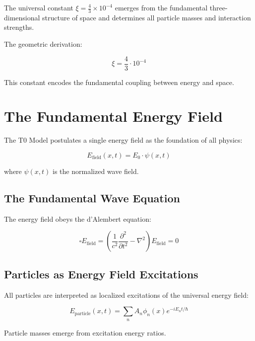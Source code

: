 	\begin{insight}
		The universal constant $\xi = \frac{4}{3} \times 10^{-4}$ emerges from the fundamental three-dimensional structure of space and determines all particle masses and interaction strengths.
	\end{insight}
	
	The geometric derivation:
	
	\begin{equation}
		\xi = \frac{4}{3} \cdot 10^{-4}
	\end{equation}
	
	This constant encodes the fundamental coupling between energy and space.
	
	
	\section{The Fundamental Energy Field}
	
	The T0 Model postulates a single energy field as the foundation of all physics:
	
	\begin{equation}
		E_{\text{field}}(x,t) = E_0 \cdot \psi(x,t)
	\end{equation}
	
	where $\psi(x,t)$ is the normalized wave field.
	
	\subsection{The Fundamental Wave Equation}
	
	The energy field obeys the d'Alembert equation:
	
	\begin{equation}
		\square E_{\text{field}} = \left(\frac{1}{c^2}\frac{\partial^2}{\partial t^2} - \nabla^2\right) E_{\text{field}} = 0
	\end{equation}
	
	\subsection{Particles as Energy Field Excitations}
	
	All particles are interpreted as localized excitations of the universal energy field:
	
	\begin{equation}
		E_{\text{particle}}(x,t) = \sum_n A_n \phi_n(x) e^{-iE_n t/\hbar}
	\end{equation}
	
	Particle masses emerge from excitation energy ratios.
	
